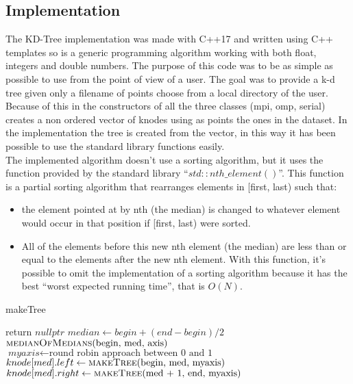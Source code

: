\documentclass[11pt,a4paper]{article}
\begin{document}
\subsection{Implementation}
The KD-Tree implementation was made with C++17 and written using C++ templates so is a generic programming algorithm working with both float, integers and double numbers. The purpose of this code was to be as simple as possible to use from the point of view of a user. The goal was to provide a k-d tree given only a filename of points choose from a local directory of the user. Because of this in the constructors of all the three classes (mpi, omp, serial) creates a non ordered vector of knodes using as points the ones in the dataset. In the implementation the tree is created from the vector, in this way it has been possible to use the standard library functions easily. \\
The implemented algorithm doesn’t use a sorting algorithm, but it uses the function provided by the standard
library “$std::nth\_element()$”. This function is a partial sorting algorithm that rearranges elements in [first,
last) such that:
\begin{center}
\begin{itemize}
\item the element pointed at by nth (the median) is changed to whatever element would occur in that position if [first, last) were sorted. \\
\item All of the elements before this new nth element (the median) are less than or equal to the elements after the new nth element. With this function, it’s possible to omit the implementation of a sorting algorithm because it has the best “worst expected running time”, that is $O(N)$. 
\end{itemize}
\end{center}
\begin{algorithm}[H]
\caption{makeTree}
\begin{algorithmic}[1]
\State return $\textit{nullptr}$
\EndIf
\State $\textit{median} \gets begin + (end - begin) / 2$
\State $\Call{medianOfMedians}{$begin, med, axis$}$
\State $\textit{myaxis} \gets \text{round robin approach between 0 and 1}$
\State $knode[med].left \gets \Call{makeTree}{$begin, med, myaxis$}$
\State $knode[med].right \gets \Call{makeTree}{$med + 1, end, myaxis$}$
\State \Return {}
\EndFunction
\end{algorithmic}
\end{algorithm}
\end{document}
